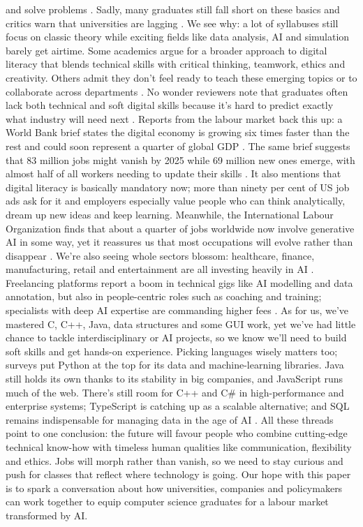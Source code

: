 \documentclass[final,5p,times,twocolumn]{elsarticle}
\begin{document}
and solve problems \cite{M4_1_tee2024demand}. Sadly, many graduates still fall short on these basics and critics warn that universities are lagging \cite{M4_1_tee2024demand}. We see why: a lot of syllabuses still focus on classic theory while exciting fields like data analysis, AI and simulation barely get airtime. Some academics argue for a broader approach to digital literacy that blends technical skills with critical thinking, teamwork, ethics and creativity. Others admit they don't feel ready to teach these emerging topics or to collaborate across departments \cite{M5_2_huang2025digital}. No wonder reviewers note that graduates often lack both technical and soft digital skills because it's hard to predict exactly what industry will need next \cite{M4_1_tee2024demand}. Reports from the labour market back this up: a World Bank brief states the digital economy is growing six times faster than the rest and could soon represent a quarter of global GDP \cite{M11_8_elzir2024building}. The same brief suggests that 83 million jobs might vanish by 2025 while 69 million new ones emerge, with almost half of all workers needing to update their skills \cite{M11_8_elzir2024building}. It also mentions that digital literacy is basically mandatory now; more than ninety per cent of US job ads ask for it and employers especially value people who can think analytically, dream up new ideas and keep learning. Meanwhile, the International Labour Organization finds that about a quarter of jobs worldwide now involve generative AI in some way, yet it reassures us that most occupations will evolve rather than disappear \cite{M12_10_ilo2025impact}. We're also seeing whole sectors blossom: healthcare, finance, manufacturing, retail and entertainment are all investing heavily in AI \cite{M14_12_nexford2025ai}. Freelancing platforms report a boom in technical gigs like AI modelling and data annotation, but also in people-centric roles such as coaching and training; specialists with deep AI expertise are commanding higher fees \cite{M13_11_upwork2025skills}. As for us, we've mastered C, C++, Java, data structures and some GUI work, yet we've had little chance to tackle interdisciplinary or AI projects, so we know we'll need to build soft skills and get hands-on experience. Picking languages wisely matters too; surveys put Python at the top for its data and machine-learning libraries. Java still holds its own thanks to its stability in big companies, and JavaScript runs much of the web. There's still room for C++ and C\# in high-performance and enterprise systems; TypeScript is catching up as a scalable alternative; and SQL remains indispensable for managing data in the age of AI \cite{M15_13_pluralsight2025languages}. All these threads point to one conclusion: the future will favour people who combine cutting-edge technical know-how with timeless human qualities like communication, flexibility and ethics. Jobs will morph rather than vanish, so we need to stay curious and push for classes that reflect where technology is going. Our hope with this paper is to spark a conversation about how universities, companies and policymakers can work together to equip computer science graduates for a labour market transformed by AI.
\end{document}
